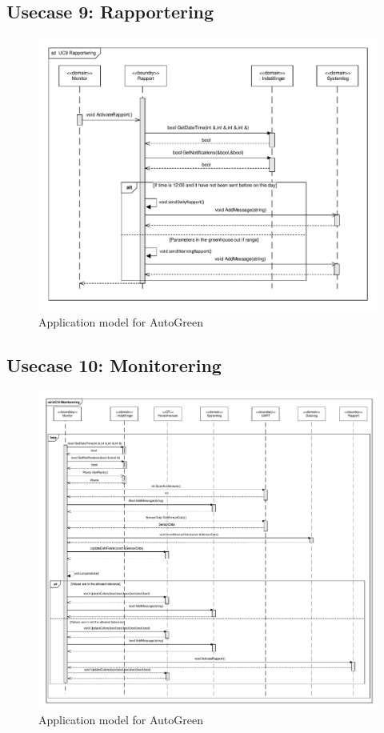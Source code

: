 \clearpage

\subsection{Usecase 9: Rapportering}

\begin{figure}[!h]
\centering 
\includegraphics[width={\textwidth-1cm}, trim=0 0 0 0, clip=true] {../fig/SD_autoGreen_UC_9_Rapportering.pdf}
\caption{Application model for AutoGreen}
\label{fig:SD_UC9}
\end{figure}

\clearpage

\subsection{Usecase 10: Monitorering}

\begin{figure}[!h]
\centering 
\includegraphics[width={\textwidth-1cm}, trim=0 0 0 0, clip=true] {../fig/SD_autoGreen_UC_10.pdf}
\caption{Application model for AutoGreen}
\label{fig:SD_UC10}
\end{figure}

